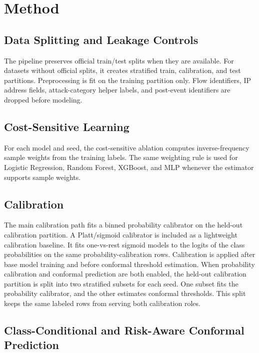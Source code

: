 \documentclass[11pt]{article}
\begin{document}
\section{Method}

\subsection{Data Splitting and Leakage Controls}

The pipeline preserves official train/test splits when they are available. For datasets without official splits, it creates stratified train, calibration, and test partitions. Preprocessing is fit on the training partition only. Flow identifiers, IP address fields, attack-category helper labels, and post-event identifiers are dropped before modeling.

\subsection{Cost-Sensitive Learning}

For each model and seed, the cost-sensitive ablation computes inverse-frequency sample weights from the training labels. The same weighting rule is used for Logistic Regression, Random Forest, XGBoost, and MLP whenever the estimator supports sample weights.

\subsection{Calibration}

The main calibration path fits a binned probability calibrator on the held-out calibration partition. A Platt/sigmoid calibrator is included as a lightweight calibration baseline. It fits one-vs-rest sigmoid models to the logits of the class probabilities on the same probability-calibration rows. Calibration is applied after base model training and before conformal threshold estimation. When probability calibration and conformal prediction are both enabled, the held-out calibration partition is split into two stratified subsets for each seed. One subset fits the probability calibrator, and the other estimates conformal thresholds. This split keeps the same labeled rows from serving both calibration roles.

\subsection{Class-Conditional and Risk-Aware Conformal Prediction}
\end{document}
